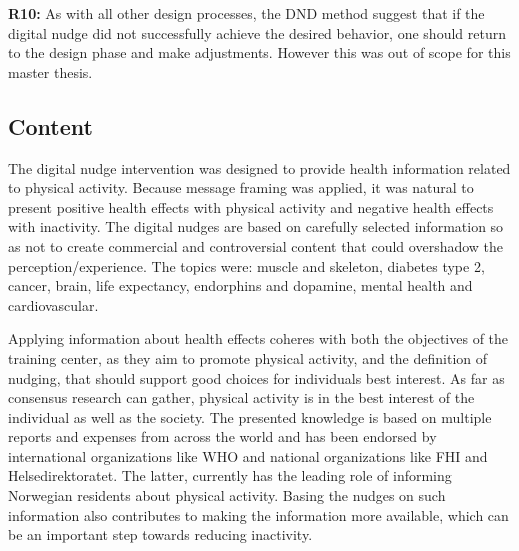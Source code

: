 \textbf{R10:} As with all other design processes, the DND method suggest that if the digital nudge did not successfully achieve the desired behavior, one should return to the design phase and make adjustments. However this was out of scope for this master thesis. 

\subsection{Content}
The digital nudge intervention was designed to provide health information related to physical activity. Because message framing was applied, it was natural to present positive health effects with physical activity and negative health effects with inactivity. The digital nudges are based on carefully selected information so as not to create commercial and controversial content that could overshadow the perception/experience. The topics were: muscle and skeleton, diabetes type 2, cancer, brain, life expectancy, endorphins and dopamine, mental health and cardiovascular. 

Applying information about health effects coheres with both the objectives of the training center, as they aim to promote physical activity, and the definition of nudging, that should support good choices for individuals best interest. As far as consensus research can gather, physical activity is in the best interest of the individual as well as the society. The presented knowledge is based on multiple reports and expenses from across the world and has been endorsed by international organizations like WHO and national organizations like FHI and Helsedirektoratet. The latter, currently has the leading role of informing Norwegian residents about physical activity. Basing the nudges on such information also contributes to making the information more available, which can be an important step towards reducing inactivity. 

